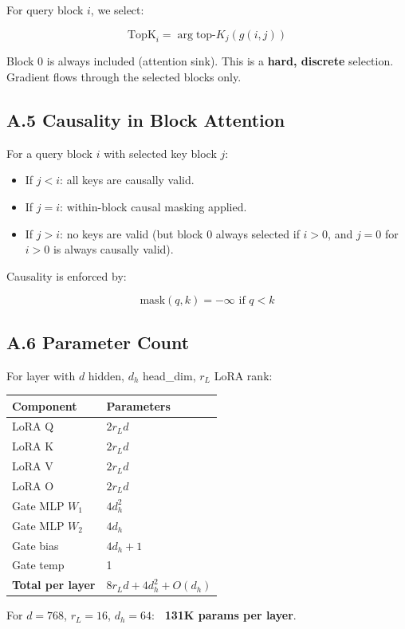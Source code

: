 For query block $i$, we select:

\[
\text{TopK}_i = \arg\text{top-}K_j (g(i, j))
\tag{A.4}
\]

Block 0 is always included (attention sink). This is a \textbf{hard, discrete} 
selection. Gradient flows through the selected blocks only.

\subsection{A.5 Causality in Block Attention}

For a query block $i$ with selected key block $j$:

\begin{itemize}
\item If $j < i$: all keys are causally valid.
\item If $j = i$: within-block causal masking applied.
\item If $j > i$: no keys are valid (but block 0 always selected if $i > 0$,
  and $j = 0$ for $i > 0$ is always causally valid).

\end{itemize}
Causality is enforced by:

\[
\text{mask}(q, k) = -\infty \text{ if } q < k
\tag{A.5}
\]

\subsection{A.6 Parameter Count}

For layer with $d$ hidden, $d_h$ head\_dim, $r_L$ LoRA rank:

\begin{table}[H]
\centering
\small
\begin{tabular}{ll}
\toprule
\textbf{Component} & \textbf{Parameters} \\
\midrule
LoRA Q & $2 r_L d$ \\
LoRA K & $2 r_L d$ \\
LoRA V & $2 r_L d$ \\
LoRA O & $2 r_L d$ \\
Gate MLP $W_1$ & $4 d_h^2$ \\
Gate MLP $W_2$ & $4 d_h$ \\
Gate bias & $4 d_h + 1$ \\
Gate temp & 1 \\
\textbf{Total per layer} & $8 r_L d + 4 d_h^2 + O(d_h)$ \\
\bottomrule
\end{tabular}
\end{table}

For $d = 768$, $r_L = 16$, $d_h = 64$: \textbf{~131K params per layer}.

